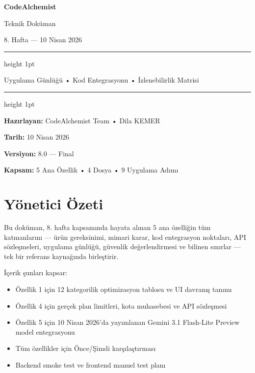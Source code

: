 \documentclass[11pt,a4paper]{article}
\begin{document}
\begin{titlepage}
  \centering
  \vspace*{3cm}
  {\Huge\bfseries\color{codeblue} CodeAlchemist\par}
  \vspace{0.5cm}
  {\Large Teknik Doküman\par}
  \vspace{0.3cm}
  {\large 8. Hafta — 10 Nisan 2026\par}
  \vspace{1.5cm}
  \hrule height 1pt
  \vspace{0.4cm}
  {\normalsize Uygulama Günlüğü \quad • \quad Kod Entegrasyonu \quad • \quad İzlenebilirlik Matrisi\par}
  \vspace{0.4cm}
  \hrule height 1pt
  \vspace{2cm}
  {\normalsize\textbf{Hazırlayan:} CodeAlchemist Team • Dila KEMER\par}
  \vspace{0.3cm}
  {\normalsize\textbf{Tarih:} 10 Nisan 2026\par}
  \vspace{0.3cm}
  {\normalsize\textbf{Versiyon:} 8.0 — Final\par}
  \vspace{0.3cm}
  {\normalsize\textbf{Kapsam:} 5 Ana Özellik • 4 Dosya • 9 Uygulama Adımı\par}
\end{titlepage}

\section*{Yönetici Özeti}

Bu doküman, 8. hafta kapsamında hayata alınan 5 ana özelliğin tüm katmanlarını — ürün gereksinimi, mimari karar, kod entegrasyon noktaları, API sözleşmeleri, uygulama günlüğü, güvenlik değerlendirmesi ve bilinen sınırlar — tek bir referans kaynağında birleştirir.

İçerik şunları kapsar:
\begin{itemize}[leftmargin=1.5em]
  \item Özellik 1 için 12 kategorilik optimizasyon tablosu ve UI davranış tanımı
  \item Özellik 4 için gerçek plan limitleri, kota muhasebesi ve API sözleşmesi
  \item Özellik 5 için 10 Nisan 2026'da yayımlanan Gemini 3.1 Flash-Lite Preview model entegrasyonu
  \item Tüm özellikler için Önce/Şimdi karşılaştırması
  \item Backend smoke test ve frontend manuel test planı
\end{itemize}
\end{document}
